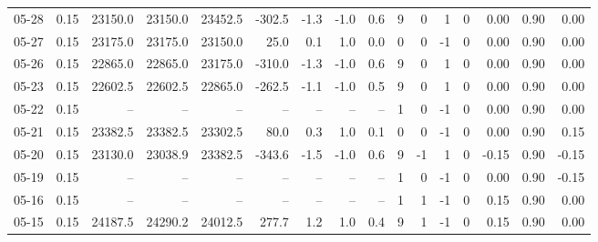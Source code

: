 \begin{threeparttable}
{\begin{tabular}{lrrrrrrrrrrrrrrr}
  05-28 &     0.15 & 23150.0 & 23150.0 & 23452.5 &     -302.5 &           -1.3 &                     -1.0 &                 0.6 &              9 &         0 &     1 &         0 &       0.00 &      0.90 &           0.00 \\
  05-27 &     0.15 & 23175.0 & 23175.0 & 23150.0 &       25.0 &            0.1 &                      1.0 &                 0.0 &              0 &         0 &    -1 &         0 &       0.00 &      0.90 &           0.00 \\
  05-26 &     0.15 & 22865.0 & 22865.0 & 23175.0 &     -310.0 &           -1.3 &                     -1.0 &                 0.6 &              9 &         0 &     1 &         0 &       0.00 &      0.90 &           0.00 \\
  05-23 &     0.15 & 22602.5 & 22602.5 & 22865.0 &     -262.5 &           -1.1 &                     -1.0 &                 0.5 &              9 &         0 &     1 &         0 &       0.00 &      0.90 &           0.00 \\
  05-22 &     0.15 &      -- &      -- &      -- &         -- &             -- &                       -- &                  -- &              1 &         0 &    -1 &         0 &       0.00 &      0.90 &           0.00 \\
  05-21 &     0.15 & 23382.5 & 23382.5 & 23302.5 &       80.0 &            0.3 &                      1.0 &                 0.1 &              0 &         0 &    -1 &         0 &       0.00 &      0.90 &           0.15 \\
  05-20 &     0.15 & 23130.0 & 23038.9 & 23382.5 &     -343.6 &           -1.5 &                     -1.0 &                 0.6 &              9 &        -1 &     1 &         0 &      -0.15 &      0.90 &          -0.15 \\
  05-19 &     0.15 &      -- &      -- &      -- &         -- &             -- &                       -- &                  -- &              1 &         0 &    -1 &         0 &       0.00 &      0.90 &          -0.15 \\
  05-16 &     0.15 &      -- &      -- &      -- &         -- &             -- &                       -- &                  -- &              1 &         1 &    -1 &         0 &       0.15 &      0.90 &           0.00 \\
  05-15 &     0.15 & 24187.5 & 24290.2 & 24012.5 &      277.7 &            1.2 &                      1.0 &                 0.4 &              9 &         1 &    -1 &         0 &       0.15 &      0.90 &           0.00 \\

\end{tabular}}
\end{threeparttable}
